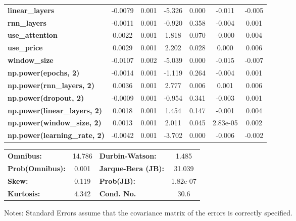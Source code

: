 \begin{center}
\begin{tabular}{lcccccc}
\textbf{linear\_layers}              &      -0.0079  &        0.001     &    -5.326  &         0.000        &       -0.011    &       -0.005     \\
\textbf{rnn\_layers}                 &      -0.0011  &        0.001     &    -0.920  &         0.358        &       -0.004    &        0.001     \\
\textbf{use\_attention}              &       0.0022  &        0.001     &     1.818  &         0.070        &       -0.000    &        0.004     \\
\textbf{use\_price}                  &       0.0029  &        0.001     &     2.202  &         0.028        &        0.000    &        0.006     \\
\textbf{window\_size}                &      -0.0107  &        0.002     &    -5.039  &         0.000        &       -0.015    &       -0.007     \\
\textbf{np.power(epochs, 2)}         &      -0.0014  &        0.001     &    -1.119  &         0.264        &       -0.004    &        0.001     \\
\textbf{np.power(rnn\_layers, 2)}    &       0.0036  &        0.001     &     2.777  &         0.006        &        0.001    &        0.006     \\
\textbf{np.power(dropout, 2)}        &      -0.0009  &        0.001     &    -0.954  &         0.341        &       -0.003    &        0.001     \\
\textbf{np.power(linear\_layers, 2)} &       0.0018  &        0.001     &     1.454  &         0.147        &       -0.001    &        0.004     \\
\textbf{np.power(window\_size, 2)}   &       0.0013  &        0.001     &     2.011  &         0.045        &     2.83e-05    &        0.002     \\
\textbf{np.power(learning\_rate, 2)} &      -0.0042  &        0.001     &    -3.702  &         0.000        &       -0.006    &       -0.002     \\
\bottomrule
\end{tabular}
\begin{tabular}{lclc}
\textbf{Omnibus:}       & 14.786 & \textbf{  Durbin-Watson:     } &    1.485  \\
\textbf{Prob(Omnibus):} &  0.001 & \textbf{  Jarque-Bera (JB):  } &   31.039  \\
\textbf{Skew:}          &  0.119 & \textbf{  Prob(JB):          } & 1.82e-07  \\
\textbf{Kurtosis:}      &  4.342 & \textbf{  Cond. No.          } &     30.6  \\
\bottomrule
\end{tabular}
\end{center}

Notes: \newline
 [1] Standard Errors assume that the covariance matrix of the errors is correctly specified.